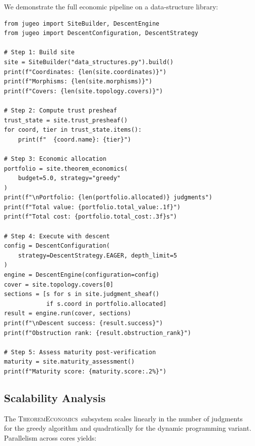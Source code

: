 \documentclass[11pt]{article}
\newcommand{\TheoremEcon}{\textsc{TheoremEconomics}}
\begin{document}
We demonstrate the full economic pipeline on a data-structure library:

\begin{lstlisting}[style=jugeo-python]
from jugeo import SiteBuilder, DescentEngine
from jugeo import DescentConfiguration, DescentStrategy

# Step 1: Build site
site = SiteBuilder("data_structures.py").build()
print(f"Coordinates: {len(site.coordinates)}")
print(f"Morphisms: {len(site.morphisms)}")
print(f"Covers: {len(site.topology.covers)}")

# Step 2: Compute trust presheaf
trust_state = site.trust_presheaf()
for coord, tier in trust_state.items():
    print(f"  {coord.name}: {tier}")

# Step 3: Economic allocation
portfolio = site.theorem_economics(
    budget=5.0, strategy="greedy"
)
print(f"\nPortfolio: {len(portfolio.allocated)} judgments")
print(f"Total value: {portfolio.total_value:.1f}")
print(f"Total cost: {portfolio.total_cost:.3f}s")

# Step 4: Execute with descent
config = DescentConfiguration(
    strategy=DescentStrategy.EAGER, depth_limit=5
)
engine = DescentEngine(configuration=config)
cover = site.topology.covers[0]
sections = [s for s in site.judgment_sheaf()
            if s.coord in portfolio.allocated]
result = engine.run(cover, sections)
print(f"\nDescent success: {result.success}")
print(f"Obstruction rank: {result.obstruction_rank}")

# Step 5: Assess maturity post-verification
maturity = site.maturity_assessment()
print(f"Maturity score: {maturity.score:.2%}")
\end{lstlisting}

\subsection{Scalability Analysis}

The \TheoremEcon\ subsystem scales linearly in the number of
judgments for the greedy algorithm and quadratically for the
dynamic programming variant.  Parallelism across cores yields:
\end{document}
